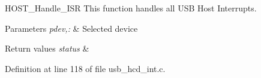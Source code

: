 H\-O\-S\-T\-\_\-\-Handle\-\_\-\-I\-S\-R This function handles all U\-S\-B Host Interrupts. 


\begin{DoxyParams}{Parameters}
{\em pdev,\-:} & Selected device \\
\hline
\end{DoxyParams}

\begin{DoxyRetVals}{Return values}
{\em status} & \\
\hline
\end{DoxyRetVals}


Definition at line 118 of file usb\-\_\-hcd\-\_\-int.\-c.

